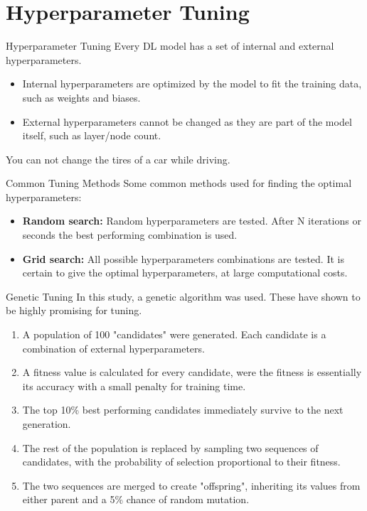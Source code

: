 \documentclass[10pt]{beamer}
\begin{document}
\section{Hyperparameter Tuning}


\begin{frame}{Hyperparameter Tuning}
Every DL model has a set of internal and external hyperparameters.
\begin{itemize}
	\item Internal hyperparameters are optimized by the model to fit the training data, such as weights and biases.
	\item External hyperparameters cannot be changed as they are part of the model itself, such as layer/node count.
\end{itemize}
You can not change the tires of a car while driving.
\end{frame}


\begin{frame}{Common Tuning Methods}
Some common methods used for finding the optimal hyperparameters:
\begin{itemize}
	\item \textbf{Random search:} Random hyperparameters are tested. After N iterations or seconds the best performing combination is used.
	\item \textbf{Grid search:} All possible hyperparameters combinations are tested. It is certain to give the optimal hyperparameters, at large computational costs.
\end{itemize}
\end{frame}


\begin{frame}{Genetic Tuning}
In this study, a genetic algorithm was used. These have shown to be highly promising for tuning.
\begin{enumerate}
	\item A population of 100 "candidates" were generated. Each candidate is a combination of external hyperparameters.
	\item A fitness value is calculated for every candidate, were the fitness is essentially its accuracy with a small penalty for training time.
	\item The top 10\% best performing candidates immediately survive to the next generation.
	\item The rest of the population is replaced by sampling two sequences of candidates, with the probability of selection proportional to their fitness.
	\item The two sequences are merged to create "offspring", inheriting its values from either parent and a 5\% chance of random mutation.
\end{enumerate}
\end{frame}
\end{document}
